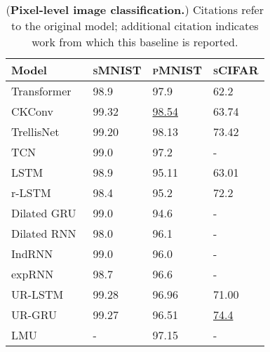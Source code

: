 \documentclass{article}
\begin{document}
\begin{table}[t]
  \small
  \centering
  \captionsetup{type=table}
  \caption{
    (\textbf{Pixel-level image classification.})
    Citations refer to the original model; additional citation indicates work from which this baseline is reported.
  }
  \begin{tabular}{@{}llll@{}}
    \toprule
    Model                                                      & \textsc{sMNIST}   & \textsc{pMNIST}   & \textsc{sCIFAR}   \\
    \midrule
    Transformer~\citep{vaswani2017attention,trinh2018learning} & 98.9              & 97.9              & 62.2              \\
    \midrule
    CKConv~\citep{romero2021ckconv}                            & 99.32             & \underline{98.54} & 63.74             \\
    TrellisNet~\citep{trellisnet}                              & 99.20             & 98.13             & 73.42             \\
    TCN~\citep{bai2018empirical}                               & 99.0              & 97.2              & -                 \\
    \midrule
    LSTM~\citep{lstm,gu2020improving}                          & 98.9              & 95.11             & 63.01             \\
    r-LSTM ~\citep{trinh2018learning}                          & 98.4              & 95.2              & 72.2              \\
    Dilated GRU~\citep{chang2017dilated}                       & 99.0              & 94.6              & -                 \\
    Dilated RNN~\citep{chang2017dilated}                       & 98.0              & 96.1              & -                 \\
    IndRNN~\citep{indrnn}                                      & 99.0              & 96.0              & -                 \\
    expRNN~\citep{lezcano2019cheap}                            & 98.7              & 96.6              & -                 \\
    UR-LSTM                                                    & 99.28             & 96.96             & 71.00             \\
    UR-GRU~\citep{gu2020improving}                             & 99.27             & 96.51             & \underline{74.4}  \\
    LMU~\citep{voelker2019legendre}                            & -                 & 97.15             & -                 \\

\end{tabular}
\end{table}
\end{document}
